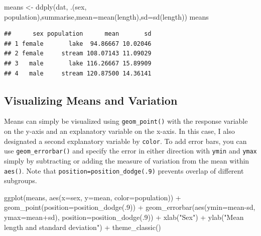 \documentclass[
]{book}
\newenvironment{Shaded}{\begin{snugshade}}{\end{snugshade}}
\newcommand{\AttributeTok}[1]{\textcolor[rgb]{0.77,0.63,0.00}{#1}}
\newcommand{\DecValTok}[1]{\textcolor[rgb]{0.00,0.00,0.81}{#1}}
\newcommand{\FunctionTok}[1]{\textcolor[rgb]{0.00,0.00,0.00}{#1}}
\newcommand{\NormalTok}[1]{#1}
\newcommand{\OtherTok}[1]{\textcolor[rgb]{0.56,0.35,0.01}{#1}}
\newcommand{\SpecialCharTok}[1]{\textcolor[rgb]{0.00,0.00,0.00}{#1}}
\newcommand{\StringTok}[1]{\textcolor[rgb]{0.31,0.60,0.02}{#1}}
\begin{document}
\begin{Shaded}
\begin{Highlighting}[]
\NormalTok{means }\OtherTok{\textless{}{-}} \FunctionTok{ddply}\NormalTok{(dat, .(sex, population),summarise,}\AttributeTok{mean=}\FunctionTok{mean}\NormalTok{(length),}\AttributeTok{sd=}\FunctionTok{sd}\NormalTok{(length))}
\NormalTok{means}
\end{Highlighting}
\end{Shaded}

\begin{verbatim}
##      sex population      mean       sd
## 1 female       lake  94.86667 10.02046
## 2 female     stream 108.07143 11.09029
## 3   male       lake 116.26667 15.89909
## 4   male     stream 120.87500 14.36141
\end{verbatim}

\hypertarget{visualizing-means-and-variation}{%
\subsection{Visualizing Means and Variation}\label{visualizing-means-and-variation}}

Means can simply be visualized using \texttt{geom\_point()} with the response variable on the y-axis and an explanatory variable on the x-axis. In this case, I also designated a second explanatory variable by \texttt{color}. To add error bars, you can use \texttt{geom\_errorbar()} and specify the error in either direction with \texttt{ymin} and \texttt{ymax} simply by subtracting or adding the measure of variation from the mean within \texttt{aes()}. Note that \texttt{position=position\_dodge(.9)} prevents overlap of different subgroups.

\begin{Shaded}
\begin{Highlighting}[]
\FunctionTok{ggplot}\NormalTok{(means, }\FunctionTok{aes}\NormalTok{(}\AttributeTok{x=}\NormalTok{sex, }\AttributeTok{y=}\NormalTok{mean, }\AttributeTok{color=}\NormalTok{population)) }\SpecialCharTok{+}
  \FunctionTok{geom\_point}\NormalTok{(}\AttributeTok{position=}\FunctionTok{position\_dodge}\NormalTok{(.}\DecValTok{9}\NormalTok{)) }\SpecialCharTok{+}
  \FunctionTok{geom\_errorbar}\NormalTok{(}\FunctionTok{aes}\NormalTok{(}\AttributeTok{ymin=}\NormalTok{mean}\SpecialCharTok{{-}}\NormalTok{sd, }\AttributeTok{ymax=}\NormalTok{mean}\SpecialCharTok{+}\NormalTok{sd), }\AttributeTok{position=}\FunctionTok{position\_dodge}\NormalTok{(.}\DecValTok{9}\NormalTok{))  }\SpecialCharTok{+}
  \FunctionTok{xlab}\NormalTok{(}\StringTok{"Sex"}\NormalTok{) }\SpecialCharTok{+}
  \FunctionTok{ylab}\NormalTok{(}\StringTok{"Mean length and standard deviation"}\NormalTok{) }\SpecialCharTok{+}
  \FunctionTok{theme\_classic}\NormalTok{()}
\end{Highlighting}
\end{Shaded}
\end{document}
